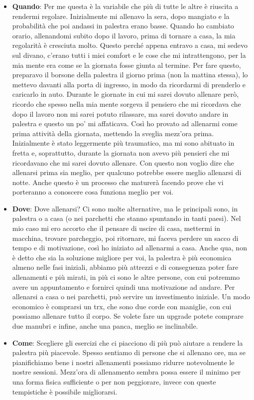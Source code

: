 \documentclass[12pt]{book} %
\begin{document}
\begin{itemize}
\item \textbf{Quando}: Per me questa è la variabile che più di tutte le altre è riuscita a rendermi regolare. Inizialmente mi allenavo la sera, dopo mangiato e la probabilità che poi andassi in palestra erano basse. Quando ho cambiato orario, allenandomi subito dopo il lavoro, prima di tornare a casa, la mia regolarità è cresciuta molto. Questo perché appena entravo a casa, mi sedevo sul divano, c'erano tutti i miei comfort e le cose che mi intrattengono, per la mia mente era come se la giornata fosse giunta al termine.
Per fare questo, preparavo il borsone della palestra il giorno prima (non la mattina stessa), lo mettevo davanti alla porta di ingresso, in modo da ricordarmi di prenderlo e caricarlo in auto. 
Durante le giornate in cui mi sarei dovuto allenare però, ricordo che spesso nella mia mente sorgeva il pensiero che mi ricordava che dopo il lavoro non mi sarei potuto rilassare, ma sarei dovuto andare in palestra e questo un po' mi affaticava. Così ho provato ad allenarmi come prima attività della giornata, mettendo la sveglia mezz'ora prima. Inizialmente è stato leggermente più traumatico, ma mi sono abituato in fretta e, soprattutto, durante la giornata non avevo più pensieri che mi ricordavano che mi sarei dovuto allenare. Con questo non voglio dire che allenarsi prima sia meglio, per qualcuno potrebbe essere meglio allenarsi di notte. Anche questo è un processo che maturerà facendo prove che vi porteranno a conoscere cosa funziona meglio per voi. 

\item \textbf{Dove}: Dove allenarsi? Ci sono molte alternative, ma le principali sono, in palestra o a casa (o nei parchetti che stanno spuntando in tanti paesi). Nel mio caso mi ero accorto che il pensare di uscire di casa, mettermi in macchina, trovare parcheggio, poi ritornare, mi faceva perdere un sacco di tempo e di motivazione, così ho iniziato ad allenarmi a casa. Anche qua, non è detto che sia la soluzione migliore per voi, la palestra è più economica almeno nelle fasi iniziali, abbiamo più attrezzi e di conseguenza poter fare allenamenti e più mirati, in più ci sono le altre persone, con cui potremmo avere un appuntamento e fornirci quindi una motivazione ad andare.
Per allenarsi a casa o nei parchetti, può servire un investimento iniziale. Un modo economico è comprarsi un trx, che sono due corde con maniglie, con cui possiamo allenare tutto il corpo. Se volete fare un upgrade potete comprare due manubri e infine, anche una panca, meglio se inclinabile.

\item \textbf{Come}: Scegliere gli esercizi che ci piacciono di più può aiutare a rendere la palestra più piacevole. Spesso sentiamo di persone che si allenano ore, ma se pianifichiamo bene i nostri allenamenti possiamo ridurre notevolmente le nostre sessioni. Mezz'ora di allenamento sembra possa essere il minimo per una forma fisica sufficiente o per non peggiorare, invece con queste tempistiche è possibile migliorarsi.
\end{itemize}
\end{document}
